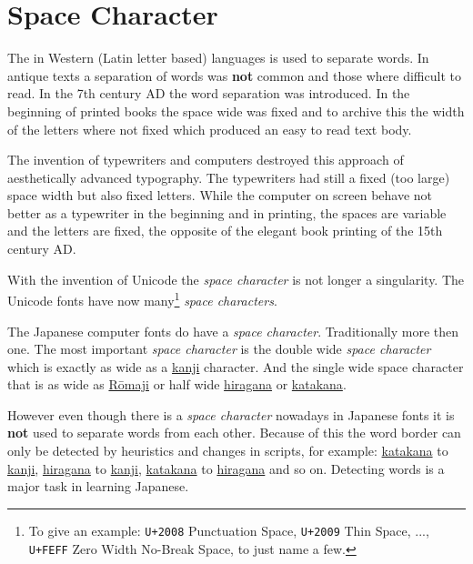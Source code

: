 \section{Space Character}
\label{sec:SpaceCharacter}

The  in Western
(Latin letter based) languages is used to separate words. In antique texts a
separation of words was \textbf{not} common and those where difficult to read.
In the 7th century AD the word separation was introduced. In the beginning of
printed books the space wide was fixed and to archive this the width of the
letters where not fixed which produced an easy to read text body.

The invention of typewriters and computers destroyed this approach of
aesthetically advanced typography. The typewriters had still a fixed (too
large) space width but also fixed letters. While the computer on screen behave
not better as a typewriter in the beginning and in printing, the spaces are
variable and the letters are fixed, the opposite of the elegant book printing
of the 15th century AD.

With the invention of Unicode the \textit{space character} is not longer a
singularity. The Unicode fonts have now many\footnote{

To give an example: \texttt{U+2008} Punctuation Space, \texttt{U+2009} Thin
Space, ..., \texttt{U+FEFF} Zero Width No-Break Space, to just name a few.

} \textit{space characters}.

The Japanese computer fonts do have a \textit{space character}. Traditionally
more then one.  The most important \textit{space character} is the double wide
\textit{space character} which is exactly as wide as a
\hyperref[sec:Kanji]{kanji} character. And the single wide space character that
is as wide as \hyperref[sec:Romaji]{Rōmaji} or half wide
\hyperref[sec:Hiragana]{hiragana} or \hyperref[sec:Katakana]{katakana}.

However even though there is a \textit{space character} nowadays in Japanese
fonts it is \textbf{not} used to separate words from each other. Because of
this the word border can only be detected by heuristics and changes in scripts,
for example: \hyperref[sec:Katakana]{katakana} to \hyperref[sec:Kanji]{kanji},
\hyperref[sec:Hiragana]{hiragana} to \hyperref[sec:Kanji]{kanji},
\hyperref[sec:Katakana]{katakana} to \hyperref[sec:Hiragana]{hiragana} and so
on. Detecting words is a major task in learning Japanese.

